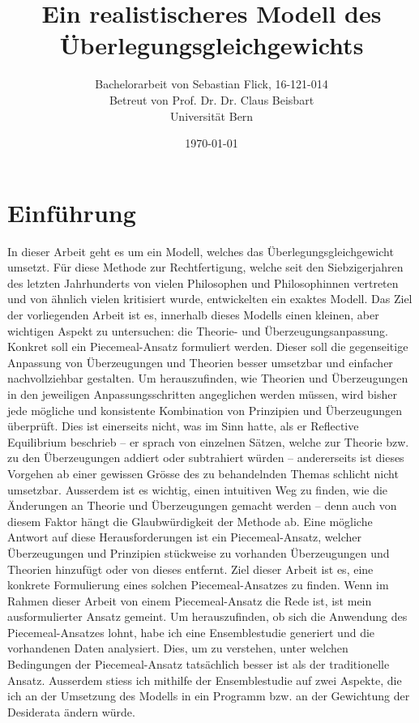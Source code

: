 \documentclass{article}
\title{Ein realistischeres Modell des Überlegungsgleichgewichts}
\author{Bachelorarbeit von Sebastian Flick, 16-121-014\\Betreut von Prof. Dr. Dr. Claus Beisbart\\Universität Bern}
\date{\today}
\begin{document}
\maketitle
\section{Einführung}
In dieser Arbeit geht es um ein Modell, welches das Überlegungsgleichgewicht umsetzt. Für diese Methode zur Rechtfertigung, welche seit den Siebzigerjahren des letzten Jahrhunderts von vielen Philosophen und Philosophinnen vertreten und von ähnlich vielen kritisiert wurde, entwickelten \cite{beisbart_making_2021} ein exaktes Modell.
Das Ziel der vorliegenden Arbeit ist es, innerhalb dieses Modells einen kleinen, aber wichtigen Aspekt zu untersuchen: die Theorie- und Überzeugungsanpassung. Konkret soll ein Piecemeal-Ansatz formuliert werden. Dieser soll die gegenseitige Anpassung von Überzeugungen und Theorien besser umsetzbar und einfacher nachvollziehbar gestalten. Um herauszufinden, wie Theorien und Überzeugungen in den jeweiligen Anpassungsschritten angeglichen werden müssen, wird bisher jede mögliche und konsistente Kombination von Prinzipien und Überzeugungen überprüft. Dies ist einerseits nicht, was \citeauthor{goodman_fact_1983} im Sinn hatte, als er Reflective Equilibrium beschrieb -- er sprach von einzelnen Sätzen, welche zur Theorie bzw. zu den Überzeugungen addiert oder subtrahiert würden \parencite[vgl.][]{goodman_fact_1983} -- andererseits ist dieses Vorgehen ab einer gewissen Grösse des zu behandelnden Themas schlicht nicht umsetzbar. Ausserdem ist es wichtig, einen intuitiven Weg zu finden, wie die Änderungen an Theorie und Überzeugungen gemacht werden -- denn auch von diesem Faktor hängt die Glaubwürdigkeit der Methode ab. Eine mögliche Antwort auf diese Herausforderungen ist ein Piecemeal-Ansatz, welcher Überzeugungen und Prinzipien stückweise zu vorhanden Überzeugungen und Theorien hinzufügt oder von dieses entfernt. Ziel dieser Arbeit ist es, eine konkrete Formulierung eines solchen Piecemeal-Ansatzes zu finden. Wenn im Rahmen dieser Arbeit von einem Piecemeal-Ansatz die Rede ist, ist mein ausformulierter Ansatz gemeint. Um herauszufinden, ob sich die Anwendung des Piecemeal-Ansatzes lohnt, habe ich eine Ensemblestudie generiert und die vorhandenen Daten analysiert. Dies, um zu verstehen, unter welchen Bedingungen der Piecemeal-Ansatz tatsächlich besser ist als der traditionelle Ansatz. Ausserdem stiess ich mithilfe der Ensemblestudie auf zwei Aspekte, die ich an der Umsetzung des Modells in ein Programm bzw. an der Gewichtung der Desiderata ändern würde.
\end{document}
